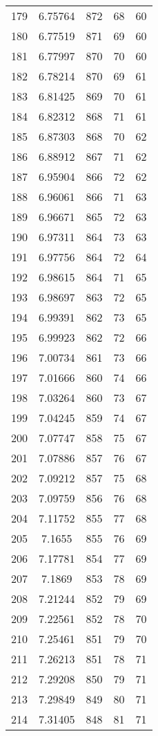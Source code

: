 \documentclass[12pt,a4paper]{article}
\begin{document}
\begin{tabular}{r|cccc}
	179 & 6.75764 & 872 & 68 & 60 \\
	180 & 6.77519 & 871 & 69 & 60 \\
	181 & 6.77997 & 870 & 70 & 60 \\
	182 & 6.78214 & 870 & 69 & 61 \\
	183 & 6.81425 & 869 & 70 & 61 \\
	184 & 6.82312 & 868 & 71 & 61 \\
	185 & 6.87303 & 868 & 70 & 62 \\
	186 & 6.88912 & 867 & 71 & 62 \\
	187 & 6.95904 & 866 & 72 & 62 \\
	188 & 6.96061 & 866 & 71 & 63 \\
	189 & 6.96671 & 865 & 72 & 63 \\
	190 & 6.97311 & 864 & 73 & 63 \\
	191 & 6.97756 & 864 & 72 & 64 \\
	192 & 6.98615 & 864 & 71 & 65 \\
	193 & 6.98697 & 863 & 72 & 65 \\
	194 & 6.99391 & 862 & 73 & 65 \\
	195 & 6.99923 & 862 & 72 & 66 \\
	196 & 7.00734 & 861 & 73 & 66 \\
	197 & 7.01666 & 860 & 74 & 66 \\
	198 & 7.03264 & 860 & 73 & 67 \\
	199 & 7.04245 & 859 & 74 & 67 \\
	200 & 7.07747 & 858 & 75 & 67 \\
	201 & 7.07886 & 857 & 76 & 67 \\
	202 & 7.09212 & 857 & 75 & 68 \\
	203 & 7.09759 & 856 & 76 & 68 \\
	204 & 7.11752 & 855 & 77 & 68 \\
	205 & 7.1655 & 855 & 76 & 69 \\
	206 & 7.17781 & 854 & 77 & 69 \\
	207 & 7.1869 & 853 & 78 & 69 \\
	208 & 7.21244 & 852 & 79 & 69 \\
	209 & 7.22561 & 852 & 78 & 70 \\
	210 & 7.25461 & 851 & 79 & 70 \\
	211 & 7.26213 & 851 & 78 & 71 \\
	212 & 7.29208 & 850 & 79 & 71 \\
	213 & 7.29849 & 849 & 80 & 71 \\
	214 & 7.31405 & 848 & 81 & 71 \\

\end{tabular}
\end{document}
